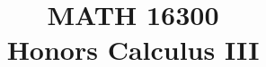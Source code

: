 \documentclass[a4paper, 10pt]{article}
\title{MATH 16300 \\ \Large Honors Calculus III}
\begin{document}
    \createintro
    
\end{document}
